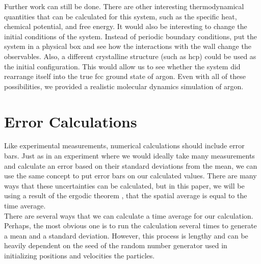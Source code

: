 \documentclass{article}
\begin{document}
\begin{multicols}{2}
Further work can still be done.  There are other interesting thermodynamical quantities that can be calculated for this system, such as the specific heat, chemical potential, and free energy.  It would also be interesting to change the initial conditions of the system.  Instead of periodic boundary conditions, put the system in a physical box and see how the interactions with the wall change the observables.  Also, a different crystalline structure (such as hcp) could be used as the initial configuration.  This would allow us to see whether the system did rearrange itself into the true fcc ground state of argon.  Even with all of these possibilities, we provided a realistic molecular dynamics simulation of argon.  

\appendix 

\section{Error Calculations}

Like experimental measurements, numerical calculations should include error bars.  Just as in an experiment where we would ideally take many measurements and calculate an error based on their standard deviations from the mean, we can use the same concept to put error bars on our calculated values.  There are many ways that these uncertainties can be calculated, but in this paper, we will be using a result of the ergodic theorem \cite{Birkhoff}, that the spatial average is equal to the time average.  \\

There are several ways that we can calculate a time average for our calculation.  Perhaps, the most obvious one is to run the calculation several times to generate a mean and a standard deviation.  However, this process is lengthy and can be heavily dependent on the seed of the random number generator used in initializing positions and velocities the particles.  \\


\end{multicols}
\end{document}
